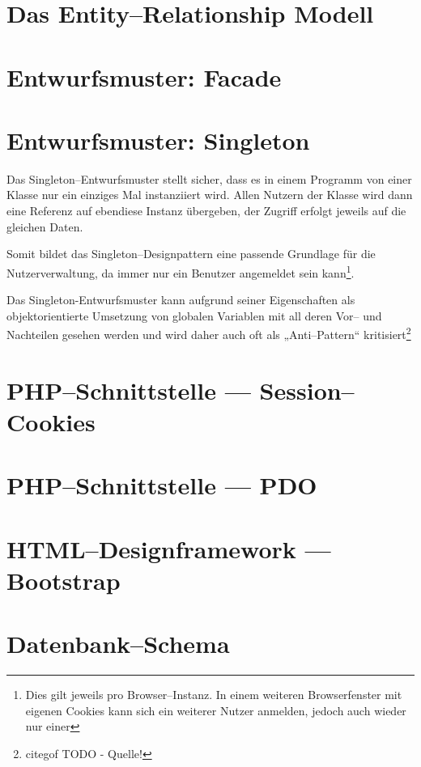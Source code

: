 \section{Das Entity--Relationship Modell}
\section{Entwurfsmuster: Facade}

\section{Entwurfsmuster: Singleton}

Das Singleton--Entwurfsmuster stellt sicher, dass es in einem Programm von einer Klasse nur ein einziges Mal instanziiert wird. Allen Nutzern der Klasse wird dann eine Referenz auf ebendiese Instanz übergeben, der Zugriff erfolgt jeweils auf die gleichen Daten.

Somit bildet das Singleton--Designpattern eine passende Grundlage für die Nutzerverwaltung, da immer nur ein Benutzer angemeldet sein kann\footnote{Dies gilt jeweils pro Browser--Instanz. In einem weiteren Browserfenster mit eigenen Cookies kann sich ein weiterer Nutzer anmelden, jedoch auch wieder nur einer}.

Das Singleton-Entwurfsmuster kann aufgrund seiner Eigenschaften als objektorientierte Umsetzung von globalen Variablen mit all deren Vor-- und Nachteilen gesehen werden und wird daher auch oft als „Anti--Pattern“ kritisiert\footnote{cite{gof} TODO - Quelle!}

\section{PHP--Schnittstelle --- Session--Cookies}
\section{PHP--Schnittstelle --- PDO}
\section{HTML--Designframework --- Bootstrap}









\section{Datenbank--Schema}

